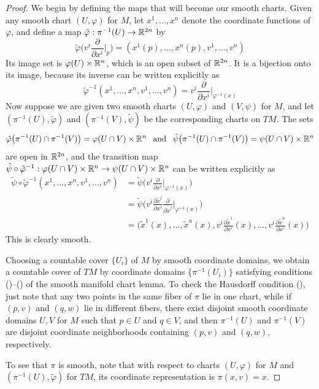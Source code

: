 \begin{proof}
We begin by defining the maps that will become our smooth charts. Given any smooth chart $(U,\varphi)$ for $M$, let $x^1,\dots,x^n$ denote the coordinate functions
of $\varphi$, and define a map $\tilde{\varphi}:\pi^{-1}(U)\to\mathbb{R}^{2n}$ by
\[\tilde{\varphi}\Big(v^i\frac{\partial}{\partial x^i}\Big|_p\Big)=(x^1(p),\dots,x^n(p),v^1,\dots,v^n)\]
Its image set is $\varphi(U)\times\mathbb{R}^n$, which is an open subset of $\mathbb{R}^{2n}$. It is a bijection onto its image, because its inverse can be written explicitly as
\[\tilde{\varphi}^{-1}(x^1,\dots,x^n,v^1,\dots,v^n)=v^i\frac{\partial}{\partial x^i}\Big|_{\varphi^{-1}(x)}\]
Now suppose we are given two smooth charts $(U,\varphi)$ and $(V,\psi)$ for $M$, and let $(\pi^{-1}(U),\tilde{\varphi})$ and $(\pi^{-1}(V),\tilde{\psi})$ be the corresponding charts on $TM$. The sets
\[\tilde{\varphi}\big(\pi^{-1}(U)\cap\pi^{-1}(V)\big)=\varphi(U\cap V)\times\mathbb{R}^n\hspace{8pt}\text{and}\hspace{8pt}\tilde{\psi}\big(\pi^{-1}(U)\cap\pi^{-1}(V)\big)=\psi(U\cap V)\times\mathbb{R}^n\]
are open in $\mathbb{R}^{2n}$, and the transition map $\tilde{\psi}\circ\tilde{\varphi}^{-1}:\varphi(U\cap V)\times\mathbb{R}^n\to\psi(U\cap V)\times\mathbb{R}^n$ can be written explicitly as
\begin{align*}
\tilde{\psi}\circ\tilde{\varphi}^{-1}(x^1,\dots,x^n,v^1,\dots,v^n)&=\tilde{\psi}\Big(v^i\frac{\partial}{\partial x^i}\Big|_{\varphi^{-1}(x)}\Big)\\
&=\tilde{\psi}\Big(v^i\frac{\partial\widetilde{x}^j}{\partial x^i}\frac{\partial}{\partial \widetilde{x}^j}\Big|_{\varphi^{-1}(x)}\Big)\\
&=\big(\widetilde{x}^1(x),\dots,\widetilde{x}^n(x),v^i\frac{\partial\widetilde{x}^1}{\partial x^i}(x),\dots,v^i\frac{\partial\widetilde{x}^n}{\partial x^i}(x)\big)
\end{align*}
This is clearly smooth.\par
Choosing a countable cover $\{U_i\}$ of $M$ by smooth coordinate domains, we obtain a countable cover of $TM$ by coordinate domains $\{\pi^{-1}(U_i)\}$ satisfying conditions ()--() of the smooth manifold chart lemma. To check the Hausdorff condition (), just note that any two points in the same fiber of $\pi$ lie in one chart, while if $(p,v)$ and $(q,w)$ lie in different fibers, there exist disjoint smooth coordinate domains $U,V$ for $M$ such that $p\in U$ and $q\in V$, and then $\pi^{-1}(U)$ and $\pi^{-1}(V)$ are disjoint coordinate neighborhoods containing $(p,v)$ and $(q,w)$, respectively.\par
To see that $\pi$ is smooth, note that with respect to charts $(U,\varphi)$ for $M$ and $(\pi^{-1}(U),\tilde{\varphi})$ for $TM$, its coordinate representation is $\pi(x,v)=x$.
\end{proof}
